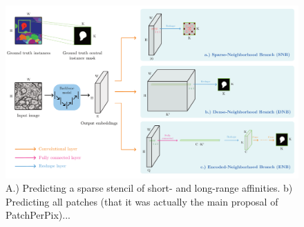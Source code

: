\begin{figure}[t]
\centering
        \includegraphics[width=\textwidth]{./figs/main_fig.pdf} %
        \caption{A.) Predicting a sparse stencil of short- and long-range affinities. b) Predicting all patches (that it was actually the main proposal of PatchPerPix)...}
    \label{fig:main_figure}
\end{figure}


